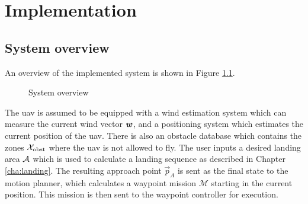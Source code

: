 \chapter{Implementation}\label{cha:implementation}
\section{System overview}
An overview of the implemented system is shown in Figure \ref{fig:sys_overview}.
\begin{figure}[H]
    \begin{center}
    \end{center}
    \caption{System overview}
    \label{fig:sys_overview}
\end{figure}
The \ac{uav} is assumed to be equipped with a wind estimation system which can measure the current wind vector $\boldsymbol{w}$, and a positioning system which estimates the current position of the \ac{uav}. 
There is also an obstacle database which contains the zones $\mathcal{X}_{\text{obst}}$ where the \ac{uav} is not allowed to fly. The user inputs a desired landing area $\mathcal{A}$ which is 
used to calculate a landing sequence as described in Chapter \ref{cha:landing}. The resulting approach point $\vec{p}_A$ is sent as the final state to the motion planner, which calculates a waypoint mission $\mathcal{M}$ 
starting in the current position. This mission is then sent to the waypoint controller for execution.


